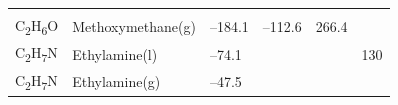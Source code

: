 \documentclass[
  9pt,
]{extbook}
\theoremstyle{definition}
\theoremstyle{definition}
\theoremstyle{definition}
\theoremstyle{remark}
\begin{document}
\begin{longtable}[]{@{}llllll@{}}
\begin{minipage}[t]{0.14\columnwidth}
\strut
\end{minipage}\tabularnewline
\begin{minipage}[t]{0.07\columnwidth}\raggedright
C\textsubscript{2}H\textsubscript{6}O\strut
\end{minipage} & \begin{minipage}[t]{0.17\columnwidth}\raggedright
Methoxymethane(g)\strut
\end{minipage} & \begin{minipage}[t]{0.15\columnwidth}\raggedright
--184.1\strut
\end{minipage} & \begin{minipage}[t]{0.15\columnwidth}\raggedright
--112.6\strut
\end{minipage} & \begin{minipage}[t]{0.14\columnwidth}\raggedright
266.4\strut
\end{minipage} & \begin{minipage}[t]{0.14\columnwidth}\raggedright
\strut
\end{minipage}\tabularnewline
\begin{minipage}[t]{0.07\columnwidth}\raggedright
C\textsubscript{2}H\textsubscript{7}N\strut
\end{minipage} & \begin{minipage}[t]{0.17\columnwidth}\raggedright
Ethylamine(l)\strut
\end{minipage} & \begin{minipage}[t]{0.15\columnwidth}\raggedright
--74.1\strut
\end{minipage} & \begin{minipage}[t]{0.15\columnwidth}\raggedright
\strut
\end{minipage} & \begin{minipage}[t]{0.14\columnwidth}\raggedright
\strut
\end{minipage} & \begin{minipage}[t]{0.14\columnwidth}\raggedright
130\strut
\end{minipage}\tabularnewline
\begin{minipage}[t]{0.07\columnwidth}\raggedright
C\textsubscript{2}H\textsubscript{7}N\strut
\end{minipage} & \begin{minipage}[t]{0.17\columnwidth}\raggedright
Ethylamine(g)\strut
\end{minipage} & \begin{minipage}[t]{0.15\columnwidth}\raggedright
--47.5\strut
\end{minipage} & \begin{minipage}[t]{0.15\columnwidth}\raggedright

\end{minipage}
\end{longtable}
\end{document}

